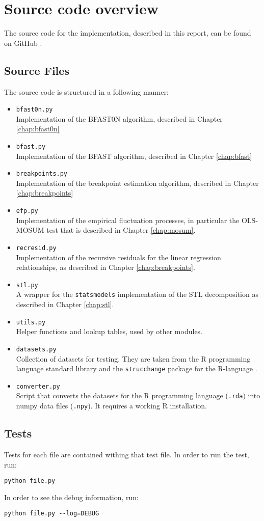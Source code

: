 \documentclass[main.tex]{subfiles}
\begin{document}
\chapter{Source code overview}
\label{a_chap:source_code_overview}
The source code for the implementation, described in this report, can be found on GitHub \cite{my-github}.
\section{Source Files}
\label{sec:source_files}
The source code is structured in a following manner:
\begin{itemize}
\item \texttt{bfast0n.py}\\
  Implementation of the BFAST0N algorithm, described in Chapter \ref{chap:bfast0n}
\item \texttt{bfast.py}\\
  Implementation of the BFAST algorithm, described in Chapter \ref{chap:bfast}
\item \texttt{breakpoints.py}\\
  Implementation of the breakpoint estimation algorithm, described in Chapter \ref{chap:breakpoints}
\item \texttt{efp.py}\\
  Implementation of the empirical fluctuation processes, in particular the OLS-MOSUM test that is
  described in Chapter \ref{chap:mosum}.
\item \texttt{recresid.py}\\
  Implementation of the recursive residuals for the linear regression relationships,
  as described in Chapter \ref{chap:breakpoints}.
\item \texttt{stl.py} \\
  A wrapper for the \texttt{statsmodels} \cite{statsmodels} implementation of the STL decomposition as
  described in Chapter \ref{chap:stl}.
\item \texttt{utils.py} \\
  Helper functions and lookup tables, used by other modules. 
\item \texttt{datasets.py}\\
  Collection of datasets for testing. They are taken from the R programming language standard library
  \cite{r-datasets} and
  the \texttt{strucchange} package for the R-language \cite{strucchange_code}.
\item \texttt{converter.py}\\
  Script that converts the datasets for the R programming language (\texttt{.rda}) into numpy
  data files (\texttt{.npy}). It requires a working R installation.
\end{itemize}

\section{Tests}
\label{sec:source_files}
Tests for each file are contained withing that test file. In order to run the test, run:
\begin{verbatim}
python file.py
\end{verbatim}
In order to see the debug information, run:
\begin{verbatim}
python file.py --log=DEBUG
\end{verbatim}

\biblio
\end{document}
